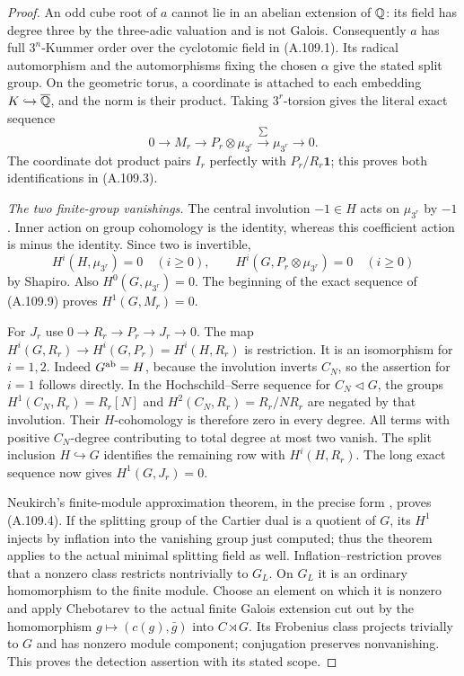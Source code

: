 \begin{proof}
An odd cube root of $a$ cannot lie in an abelian extension of $\mathbb Q$:
its field has degree three by the three-adic valuation and is not
Galois.  Consequently $a$ has full $3^n$-Kummer order over the
cyclotomic field in (A.109.1).  Its radical automorphism and the
automorphisms fixing the chosen $\alpha$ give the stated split group.
On the geometric torus, a coordinate is attached to each embedding
$K\hookrightarrow\overline{\mathbb Q}$, and the norm is their product.
Taking $3^r$-torsion gives the literal exact sequence
\[
 0\longrightarrow M_r\longrightarrow P_r\otimes\mu_{3^r}
      \xrightarrow{\sum}\mu_{3^r}\longrightarrow0.
 \tag{A.109.9}
\]
The coordinate dot product pairs $I_r$ perfectly with
$P_r/R_r\mathbf1$; this proves both identifications in (A.109.3).

\emph{The two finite-group vanishings.}
The central involution $-1\in H$ acts on $\mu_{3^r}$ by $-1$.
Inner action on group cohomology is the identity, whereas this
coefficient action is minus the identity.  Since two is invertible,
\[
 H^i(H,\mu_{3^r})=0\quad(i\ge0),\qquad
 H^i(G,P_r\otimes\mu_{3^r})=0\quad(i\ge0)
 \tag{A.109.10}
\]
by Shapiro.  Also $H^0(G,\mu_{3^r})=0$.
The beginning of the exact sequence of (A.109.9) proves
$H^1(G,M_r)=0$.

For $J_r$ use $0\to R_r\to P_r\to J_r\to0$.
The map $H^i(G,R_r)\to H^i(G,P_r)=H^i(H,R_r)$ is restriction.
It is an isomorphism for $i=1,2$.
Indeed $G^{\rm ab}=H$, because the involution inverts $C_N$,
so the assertion for $i=1$ follows directly.
In the Hochschild--Serre sequence for $C_N\triangleleft G$, the groups
$H^1(C_N,R_r)=R_r[N]$ and $H^2(C_N,R_r)=R_r/NR_r$
are negated by that involution.
Their $H$-cohomology is therefore zero in every degree.
All terms with positive $C_N$-degree contributing to total degree
at most two vanish.  The split inclusion $H\hookrightarrow G$
identifies the remaining row with $H^i(H,R_r)$.
The long exact sequence now gives $H^1(G,J_r)=0$.

Neukirch's finite-module approximation theorem, in the precise form
\cite[Theorem 2.1(c)]{BIR_Neftin2013}, proves (A.109.4).
If the splitting group of the Cartier dual is a quotient of $G$,
its $H^1$ injects by inflation into the vanishing group just computed;
thus the theorem applies to the actual minimal splitting field as well.
Inflation--restriction proves that a nonzero class restricts
nontrivially to $G_L$.  On $G_L$ it is an ordinary homomorphism to
the finite module.  Choose an element on which it is nonzero and
apply Chebotarev to the actual finite Galois extension cut out by
the homomorphism $g\mapsto(c(g),\bar g)$ into $C\rtimes G$.
Its Frobenius class projects trivially to $G$ and has nonzero module
component; conjugation preserves nonvanishing.
This proves the detection assertion with its stated scope.


\end{proof}
